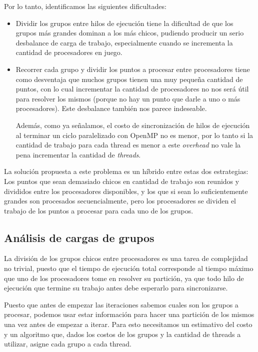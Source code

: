 Por lo tanto, identificamos las siguientes dificultades:

\begin{itemize}
    \item Dividir los grupos entre hilos de ejecuci\'on tiene la dificultad de que
    los grupos m\'as grandes dominan a los m\'as chicos, pudiendo producir un serio
    desbalance de carga de trabajo, especialmente cuando se incrementa la cantidad de
    procesadores en juego.
    \item Recorrer cada grupo y dividir los puntos a procesar entre procesadores
    tiene como desventaja que muchos grupos tienen una muy peque\~na cantidad de
    puntos, con lo cual incrementar la cantidad de procesadores no nos ser\'a \'util
    para resolver los mismos (porque no hay un punto que darle a uno o m\'as procesadores).
    Este desbalance tambi\'en nos parece indeseable.

    Adem\'as, como ya se\~nalamos, el costo de sincronizaci\'on de hilos de
    ejecuci\'on al terminar un ciclo paralelizado con OpenMP no es menor, por
    lo tanto si la cantidad de trabajo para cada thread es menor a este
    \textit{overhead} no vale la pena incrementar la cantidad de \textit{threads}.
\end{itemize}

La soluci\'on propuesta a este problema es un h\'ibrido entre estas dos
estrategias: Los puntos que sean demasiado chicos en cantidad de trabajo son
reunidos y divididos entre los procesadores disponibles, y los que si sean lo
suficientemente grandes son procesados secuencialmente, pero los procesadores se
dividen el trabajo de los puntos a procesar para cada uno de los grupos.

\subsection{An\'alisis de cargas de grupos}

La divisi\'on de los grupos chicos entre procesadores es una tarea de complejidad
no trivial, puesto que el tiempo de ejecuci\'on total corresponde al tiempo m\'aximo
que uno de los procesadores tome en resolver su partici\'on, ya que todo hilo de
ejecuci\'on que termine su trabajo antes debe esperarlo para sincronizarse.

Puesto que antes de empezar las iteraciones sabemos cuales son los grupos a
procesar, podemos usar estar informaci\'on para hacer una partici\'on de los mismos
una vez antes de empezar a iterar. Para esto necesitamos un estimativo del costo
y un algoritmo que, dados los costos de los grupos y la cantidad de threads a
utilizar, asigne cada grupo a cada thread.

